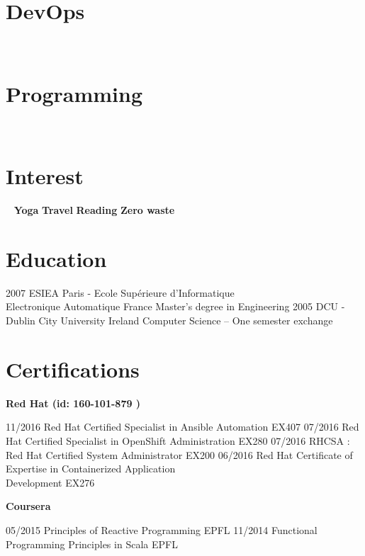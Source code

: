 \documentclass[]{friggeri-cv}
\begin{document}
\begin{aside}
~
~
~
\section{DevOps}
~  
~  
\section{Programming}
~  
    ~
   	\section{Interest}
   	~  
    	\textbf{Yoga}
    	\textbf{Travel} 
    	\textbf{Reading} 
    	\textbf{Zero waste}        	
    	~
\end{aside}
\section{Education}
\begin{entrylist}
	\entry
	{2007}
	{ESIEA Paris - Ecole Supérieure d’Informatique \\  Electronique Automatique}
	{France}
	{Master's degree in Engineering}
	\entry
	{2005}
	{DCU - Dublin City University}
	{Ireland}
	{Computer Science – One semester exchange}	
\end{entrylist}
\section{Certifications}        
    \textbf{ Red Hat (id: 160-101-879 ) \vspace{0.1cm}\\}        
	\begin{entrylist}
	
	\setlength{\parsepsave}{\parsep}%
	\setlength{\parsep}{-3pt}%
	
	\entryNoDetail
		{11/2016}
		{Red Hat Certified Specialist in Ansible Automation}
	    {EX407}
	    \entryNoDetail
	    {07/2016}
	    {Red Hat Certified Specialist in OpenShift Administration}
	    {EX280}
	    \entryNoDetail
	    {07/2016}
	    {RHCSA : Red Hat Certified System Administrator }
	    {EX200}   
	    \entryNoDetail
	    {06/2016}
	    {Red Hat Certificate of Expertise in Containerized Application \\ Development}
	    {EX276}
	\end{entrylist}    
	\textbf{Coursera \vspace{0.1cm}\\}    
	\begin{entrylist}
	\entryNoDetail
		{05/2015} 
		{Principles of Reactive Programming }
		{EPFL}
		\entryNoDetail
		{11/2014}
		{Functional Programming Principles in Scala}
		{EPFL}
	\end{entrylist}    
\end{document}

